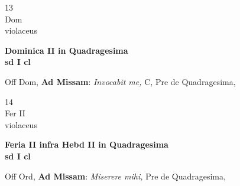 \documentclass[10pt, openany]{book}
\begin{document}
        \begin{center}
            \begin{minipage}{3.5in}
                \vspace{2em}
                \begin{minipage}{0.5in}
                    {\Huge 13} \\
                    {\normalsize Dom} \\
                    {\normalsize violaceus}
                \end{minipage}
                \begin{minipage}{3.0in}
                    \textbf{ \large Dominica II in Quadragesima \\
                    \textnormal{\normalsize sd I cl}} \\ 
                \end{minipage}
                \begin{justify}Off Dom, \textbf{Ad Missam}: \textit{Invocabit me,} C, Pre de Quadragesima,  
                \end{justify}
            \end{minipage}
        \end{center}
    
        \begin{center}
            \begin{minipage}{3.5in}
                \vspace{2em}
                \begin{minipage}{0.5in}
                    {\Huge 14} \\
                    {\normalsize Fer II} \\
                    {\normalsize violaceus}
                \end{minipage}
                \begin{minipage}{3.0in}
                    \textbf{ \large Feria II infra Hebd II in Quadragesima \\
                    \textnormal{\normalsize sd I cl}} \\ 
                \end{minipage}
                \begin{justify}Off Ord, \textbf{Ad Missam}: \textit{Miserere mihi,} Pre de Quadragesima,  
                \end{justify}
            \end{minipage}
        \end{center}
    
\end{document}

